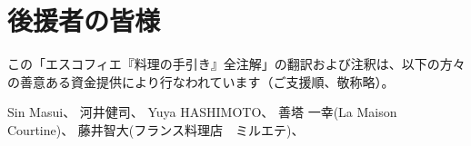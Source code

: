 \hypertarget{benefactors}{%
\section{後援者の皆様}\label{benefactors}}

\thispagestyle{empty}

この「エスコフィエ『料理の手引き』全注解」の翻訳および注釈は、以下の方々の善意ある資金提供により行なわれています（ご支援順、敬称略）。

Sin Masui、\href{20180524-23h,2x,novelsoundsmail@gmail.com}{}
河井健司、\href{20180525-0h14,10x,kwibeng@gmail.com}{} Yuya
HASHIMOTO、\href{20180525-1h40,2x,hashimo0910@gmail.com}{} 善塔 一幸(La
Maison
Courtine)、\href{20180525-8h56,10x,kazuyukizento120@docomo.ne.jp}{}
藤井智大(フランス料理店　ミルエテ)、\href{20180525-10h07,1x,apple19761019@yahoo.co.jp}{}
